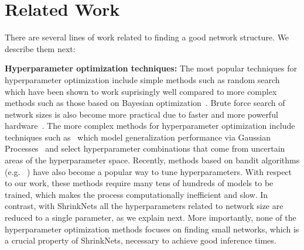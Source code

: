 \section{Related Work}


There are several lines of work related to finding a good network structure. We
describe them next:


\noindent\textbf{Hyperparameter optimization techniques: }The most popular
techniques for hyperparameter optimization include simple methods such as random
search~\cite{BergstraJAMESBERGSTRA2012} which have been shown to work
suprisingly well compared to more complex methods such as those based on
Bayesian optimization~\cite{Snoek12}.  Brute force search of network sizes is
also become more practical due to faster and more powerful
hardware~\cite{molchanov2016pruning}.  The more complex methods for
hyperparameter optimization include techniques such as~\cite{Snoek12} which
model generalization performance via Gaussian Processes~\cite{GaussianProcesses}
and select hyperparameter combinations that come from uncertain areas of the
hyperparameter space. Recently, methods based on bandit algorithms (e.g.
~\cite{li2016hyperband, jamieson2016}) have also become a popular way to tune
hyperparameters. With respect to our work, these methods require many tens of
hundreds of models to be trained, which makes the process computationally
inefficient and slow. In contrast, with ShrinkNets all the hyperparameters
related to network size are reduced to a single parameter, as we explain next.
More importantly, none of the hyperparameter optimization methods focuses on
finding small networks, which is a crucial property of ShrinkNets, necessary to
achieve good inference times.

